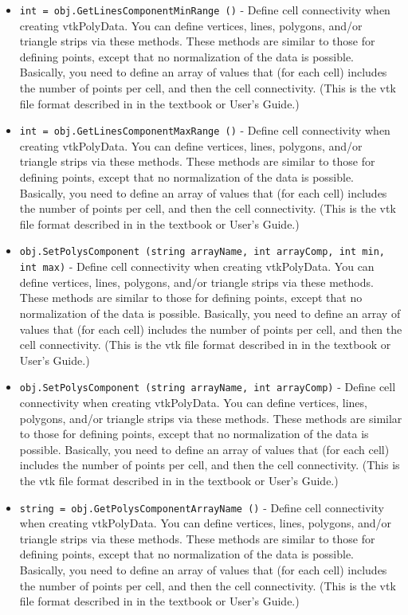 \begin{itemize}
\item  \verb|int = obj.GetLinesComponentMinRange ()| -  Define cell connectivity when creating vtkPolyData. You can define
 vertices, lines, polygons, and/or triangle strips via these methods.
 These methods are similar to those for defining points, except
 that no normalization of the data is possible. Basically, you need to
 define an array of values that (for each cell) includes the number of 
 points per cell, and then the cell connectivity. (This is the vtk file 
 format described in in the textbook or User's Guide.)

\item  \verb|int = obj.GetLinesComponentMaxRange ()| -  Define cell connectivity when creating vtkPolyData. You can define
 vertices, lines, polygons, and/or triangle strips via these methods.
 These methods are similar to those for defining points, except
 that no normalization of the data is possible. Basically, you need to
 define an array of values that (for each cell) includes the number of 
 points per cell, and then the cell connectivity. (This is the vtk file 
 format described in in the textbook or User's Guide.)

\item  \verb|obj.SetPolysComponent (string arrayName, int arrayComp, int min, int max)| -  Define cell connectivity when creating vtkPolyData. You can define
 vertices, lines, polygons, and/or triangle strips via these methods.
 These methods are similar to those for defining points, except
 that no normalization of the data is possible. Basically, you need to
 define an array of values that (for each cell) includes the number of 
 points per cell, and then the cell connectivity. (This is the vtk file 
 format described in in the textbook or User's Guide.)

\item  \verb|obj.SetPolysComponent (string arrayName, int arrayComp)| -  Define cell connectivity when creating vtkPolyData. You can define
 vertices, lines, polygons, and/or triangle strips via these methods.
 These methods are similar to those for defining points, except
 that no normalization of the data is possible. Basically, you need to
 define an array of values that (for each cell) includes the number of 
 points per cell, and then the cell connectivity. (This is the vtk file 
 format described in in the textbook or User's Guide.)

\item  \verb|string = obj.GetPolysComponentArrayName ()| -  Define cell connectivity when creating vtkPolyData. You can define
 vertices, lines, polygons, and/or triangle strips via these methods.
 These methods are similar to those for defining points, except
 that no normalization of the data is possible. Basically, you need to
 define an array of values that (for each cell) includes the number of 
 points per cell, and then the cell connectivity. (This is the vtk file 
 format described in in the textbook or User's Guide.)


\end{itemize}
